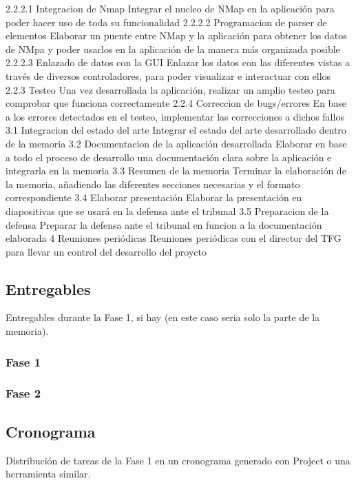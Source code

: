 	{}
\taskframe
	{2.2.2.1}
	{Integracion de Nmap}
	{Integrar el nucleo de NMap en la aplicación para poder hacer uso de toda su funcionalidad}
	{}
\taskframe
	{2.2.2.2}
	{Programacion de parser de elementos}
	{Elaborar un puente entre NMap y la aplicación para obtener los datos de NMpa y poder usarlos en la aplicación de la manera más organizada posible}
	{}
\taskframe
	{2.2.2.3}
	{Enlazado de datos con la GUI}
	{Enlazar los datos con las diferentes vistas a través de diversos controladores, para poder visualizar e interactuar con ellos}
	{}
\taskframe
	{2.2.3}
	{Testeo}
	{Una vez desarrollada la aplicación, realizar un amplio testeo para comprobar que funciona correctamente}
	{}
\taskframe
	{2.2.4}
	{Correccion de bugs/errores}
	{En base a los errores detectados en el testeo, implementar las correcciones a dichos fallos}
	{}
\taskframe
	{3.1}
	{Integracion del estado del arte}
	{Integrar el estado del arte desarrollado dentro de la memoria}
	{}
\taskframe
	{3.2}
	{Documentacion de la aplicación desarrollada}
	{Elaborar en base a todo el proceso de desarrollo una documentación clara sobre la aplicación e integrarla en la memoria}
	{}
\taskframe
	{3.3}
	{Resumen de la memoria}
	{Terminar la elaboración de la memoria, añadiendo las diferentes secciones necesarias y el formato correspondiente}
	{}
\taskframe
	{3.4}
	{Elaborar presentación}
	{Elaborar la presentación en diapositivas que se usará en la defensa ante el tribunal}
	{}
\taskframe
	{3.5}
	{Preparacion de la defensa}
	{Preparar la defensa ante el tribunal en funcion a la documentación elaborada}
	{}
\taskframe
	{4}
	{Reuniones periódicas}
	{Reuniones periódicas con el director del TFG para llevar un control del desarrollo del proycto}
	{}

\subsection{Entregables}
{\color{red} Entregables durante la Fase 1, si hay (en este caso seria solo la parte de la memoria).}

\subsubsection{Fase 1}
\subsubsection{Fase 2}

\subsection{Cronograma}
{\color{red} Distribución de tareas de la Fase 1 en un cronograma generado con Project o una herramienta similar.}


